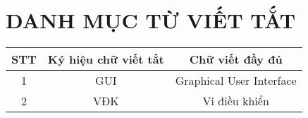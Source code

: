 \chapter*{DANH MỤC TỪ VIẾT TẮT}
\begin{center}
	\begin{tabular}{|c|c|c|}
	\hline 
	STT & Ký hiệu chữ viết tắt & Chữ viết đầy đủ \\ 
	\hline 
	1 & GUI & Graphical User Interface \\ 
	\hline 
	2 & VĐK & Vi điều khiển \\ 
	\hline 
	\end{tabular} 
\end{center}
